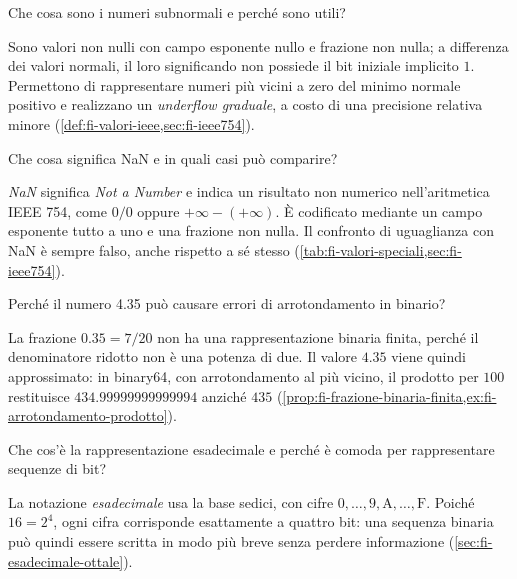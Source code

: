 \begin{exercise}
\label{ex:fi-rappresentazione-subnormali}
Che cosa sono i numeri subnormali e perché sono utili?
\end{exercise}

Sono valori non nulli con campo esponente nullo e frazione non nulla;
a differenza dei valori normali, il loro significando non possiede
il bit iniziale implicito \(1\). Permettono di rappresentare
numeri più vicini a zero del minimo normale positivo e realizzano
un \emph{underflow graduale}, a costo di una precisione relativa
minore (\cref{def:fi-valori-ieee,sec:fi-ieee754}).

\begin{exercise}
\label{ex:fi-rappresentazione-nan}
Che cosa significa NaN e in quali casi può comparire?
\end{exercise}

\emph{NaN} significa \emph{Not a Number} e indica un risultato
non numerico nell'aritmetica IEEE 754, come \(0/0\) oppure
\(+\infty-(+\infty)\). È codificato mediante un campo esponente
tutto a uno e una frazione non nulla. Il confronto di uguaglianza
con NaN è sempre falso, anche rispetto a sé stesso
(\cref{tab:fi-valori-speciali,sec:fi-ieee754}).

\begin{exercise}
\label{ex:fi-rappresentazione-arrotondamento-435}
Perché il numero 4.35 può causare errori di arrotondamento in binario?
\end{exercise}

La frazione \(0.35=7/20\) non ha una rappresentazione binaria
finita, perché il denominatore ridotto non è una potenza di due.
Il valore \(4.35\) viene quindi approssimato: in binary64, con
arrotondamento al più vicino, il prodotto per \(100\) restituisce
\(434.99999999999994\) anziché \(435\)
(\cref{prop:fi-frazione-binaria-finita,ex:fi-arrotondamento-prodotto}).

\begin{exercise}
\label{ex:fi-rappresentazione-esadecimale}
Che cos'è la rappresentazione esadecimale e perché è comoda
per rappresentare sequenze di bit?
\end{exercise}

La notazione \emph{esadecimale} usa la base sedici, con cifre
\(0,\ldots,9,\mathrm{A},\ldots,\mathrm{F}\). Poiché \(16=2^4\),
ogni cifra corrisponde esattamente a quattro bit: una sequenza
binaria può quindi essere scritta in modo più breve senza
perdere informazione (\cref{sec:fi-esadecimale-ottale}).

